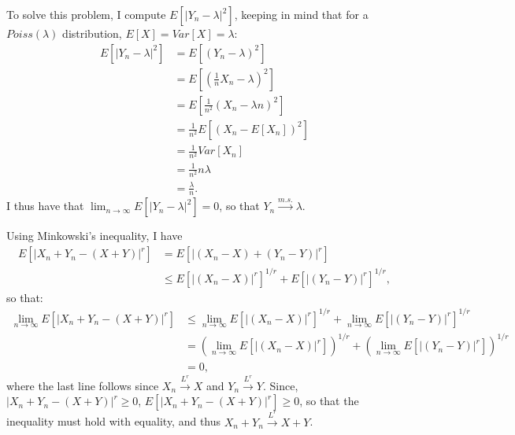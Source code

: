 \begin{problem}{17}  To solve this problem, I compute $E[|Y_n-\lambda |^2]$, keeping in mind that for a $Poiss(\lambda)$ distribution, $E[X]=Var[X]=\lambda$:
\begin{align*}
E[|Y_n-\lambda |^2]& = E[(Y_n-\lambda )^2] \\
& = E\left[\left(\frac{1}{n}X_n-\lambda \right)^2\right] \\
& = E\left[\frac{1}{n^2}(X_n - \lambda n)^2\right] \\
&=\frac{1}{n^2} E\left[(X_n - E[X_n])^2\right] \\
&=\frac{1}{n^2} Var[X_n] \\
&=\frac{1}{n^2} n\lambda \\
& = \frac{\lambda}{n}.
\end{align*}
I thus have that $\lim_{n \rightarrow \infty}E[|Y_n-\lambda |^2] = 0$, so that $Y_n \xrightarrow{m.s.} \lambda$.

\end{problem}


\begin{problem}{18}  Using Minkowski's inequality, I have
\begin{align*}
E[|X_n+Y_n -(X+Y)|^r] &= E[|(X_n-X)+(Y_n-Y)|^r]\\
 &\le E[|(X_n-X)|^r]^{1/r}+E[|(Y_n-Y)|^r]^{1/r},
\end{align*}
so that:
\begin{align*}
\lim_{n \rightarrow \infty} E[|X_n+Y_n -(X+Y)|^r] &\le \lim_{n \rightarrow \infty}E[|(X_n-X)|^r]^{1/r}+\lim_{n \rightarrow \infty}E[|(Y_n-Y)|^r]^{1/r} \\
& = \left ( \lim_{n \rightarrow \infty}E[|(X_n-X)|^r]\right)^{1/r}+\left ( \lim_{n \rightarrow \infty}E[|(Y_n-Y)|^r]\right)^{1/r} \\
& = 0,
\end{align*}
where the last line follows since $X_n\xrightarrow{L^r} X$ and $Y_n\xrightarrow{L^r} Y$.  Since, $|X_n+Y_n -(X+Y)|^r\ge0$, $E[|X_n+Y_n -(X+Y)|^r]\ge0$, so that the inequality must hold with equality, and thus $X_n+Y_n \xrightarrow{L^r} X+Y$.

\end{problem}

